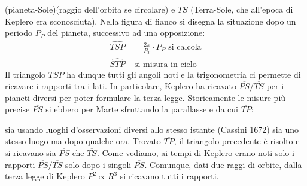 \documentclass[a4paper, oneside]{book}
\begin{document}
(pianeta-Sole)(raggio dell'orbita se circolare) e $\overline{TS}$ (Terra-Sole, che all'epoca di Keplero era sconosciuta).
Nella figura di fianco si disegna la situazione dopo un periodo $P_P$ del pianeta, successivo 
ad una opposizione:   
\begin{align*}
    \widehat{TSP} &= \frac{2\pi}{P_T} \cdot P_P \text{ si calcola} \\
    \widehat{STP} & \text{ si misura in cielo}
\end{align*}
Il triangolo $TSP$ ha dunque tutti gli angoli noti e la trigonometria 
ci permette di ricavare i rapporti tra i lati. In particolare, Keplero 
ha ricavato $\overline{PS}/\overline{TS}$ per i pianeti diversi 
per poter formulare la terza legge. Storicamente le misure più precise $\overline{PS}$ si ebbero 
per Marte sfruttando la parallasse e da cui $\overline{TP}$:
\begin{center}
\end{center}
sia usando luoghi d'osservazioni diversi allo stesso istante (Cassini 1672) sia 
uno stesso luogo ma dopo qualche ora. Trovato $\overline{TP}$, 
il triangolo precedente è risolto e si ricavano sia $\overline{PS}$ che $\overline{TS}$. 
Come vediamo, ai tempi di Keplero erano noti solo i rapporti 
$\overline{PS}/\overline{TS}$ solo dopo i singoli $\overline{PS}$. Comunque, dati 
due raggi di orbite, dalla terza legge di Keplero $P^{2} \propto R^{3}$ si ricavano tutti i rapporti.
\end{document}
